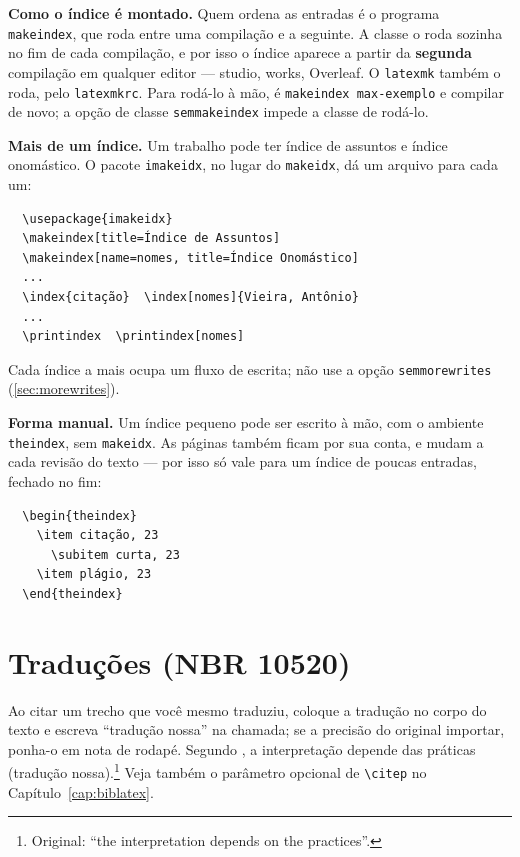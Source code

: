 \documentclass[dsc,setavermelha]{ufrj}
\theoremstyle{plain}
\theoremstyle{definition}
\theoremstyle{remark}
\begin{document}
  \textbf{Como o índice é montado.} Quem ordena as entradas é o programa \verb|makeindex|, que roda entre uma compilação e a seguinte. A classe o roda sozinha no fim de cada compilação, e por isso o índice aparece a partir da \textbf{segunda} compilação em qualquer editor --- studio, works, Overleaf. O \verb|latexmk| também o roda, pelo \texttt{latexmkrc}. Para rodá-lo à mão, é \verb|makeindex max-exemplo| e compilar de novo; a opção de classe \verb|semmakeindex| impede a classe de rodá-lo.

  \textbf{Mais de um índice.} Um trabalho pode ter índice de assuntos e índice onomástico. O pacote \verb|imakeidx|, no lugar do \verb|makeidx|, dá um arquivo para cada um:
  \begin{verbatim}
  \usepackage{imakeidx}
  \makeindex[title=Índice de Assuntos]
  \makeindex[name=nomes, title=Índice Onomástico]
  ...
  \index{citação}  \index[nomes]{Vieira, Antônio}
  ...
  \printindex  \printindex[nomes]
  \end{verbatim}
  Cada índice a mais ocupa um fluxo de escrita; não use a opção \verb|semmorewrites| (\autoref{sec:morewrites}).

  \textbf{Forma manual.} Um índice pequeno pode ser escrito à mão, com o ambiente \verb|theindex|, sem \verb|makeidx|. As páginas também ficam por sua conta, e mudam a cada revisão do texto --- por isso só vale para um índice de poucas entradas, fechado no fim:
  \begin{verbatim}
  \begin{theindex}
    \item citação, 23
      \subitem curta, 23
    \item plágio, 23
  \end{theindex}
  \end{verbatim}

  \section{Traduções (NBR 10520)}

  Ao citar um trecho que você mesmo traduziu, coloque a tradução no corpo do texto e escreva ``tradução nossa'' na chamada; se a precisão do original importar, ponha-o em nota de rodapé. Segundo \citet[p.~45]{article-example}, a interpretação depende das práticas (tradução nossa).\footnote{Original: ``the interpretation depends on the practices''.} Veja também o parâmetro opcional de \verb|\citep| no Capítulo~\ref{cap:biblatex}.
\end{document}
